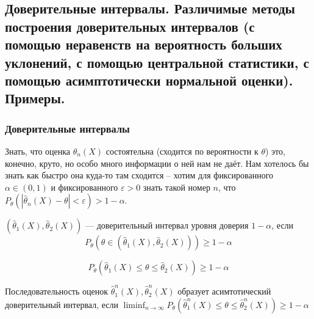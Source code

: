 \subsection{Доверительные интервалы. Различимые методы построения доверительных интервалов (с помощью неравенств на вероятность больших уклонений, с помощью центральной статистики, с помощью асимптотически нормальной оценки). Примеры.}

\subsubsection{Доверительные интервалы}

Знать, что оценка $\hat{\theta}_n(X)$ состоятельна (сходится по вероятности к $\theta$)
это, конечно, круто, но особо много информации о ней нам не даёт. Нам хотелось
бы знать как быстро она куда-то там сходится -- хотим для фиксированного
$\alpha \in (0, 1)$ и фиксированного $\varepsilon > 0$ знать такой номер $n$,
что $P_\theta(|\hat{\theta}_n(X) - \theta| < \varepsilon) > 1 - \alpha$.

\begin{definition*}
    $(\hat{\theta}_1(X), \hat{\theta}_2(X))$ --- доверительный интервал уровня 
    доверия $1 - \alpha$, если 
    \[
        P_\theta(\theta \in (\hat{\theta}_1(X), 
    \hat{\theta}_2(X))) \geq 1 - \alpha
    \]

    \[
    P_\theta(\hat{\theta}_1(X) \leq
    \theta \leq \hat{\theta}_2(X)) \geq 1 - \alpha
    \]
\end{definition*}

\begin{definition*}
    Последовательность оценок $\displaystyle \hat{\theta}_1^n(X), \hat{\theta}_2^n(X)$ образует
    асимтотический доверительный интервал, если $\displaystyle 
    \liminf_{n \to \infty}P_\theta(\hat{\theta}_1^n(X) \leq \theta \leq 
    \hat{\theta}_2^n(X)) \geq 1 - \alpha
    $
\end{definition*}

